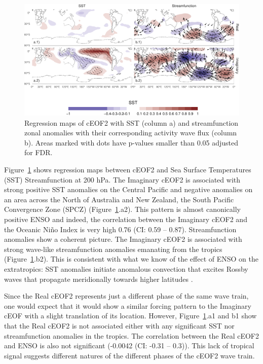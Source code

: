 \documentclass[smallextended]{svjour3}       %
\begin{document}
\begin{figure}
\includegraphics{../figures/sst-psi-2-1} \caption{Regression maps of cEOF2 with SST (column a) and streamfunction zonal anomalies with their corresponding activity wave flux (column b). Areas marked with dots have p-values smaller than 0.05 adjusted for FDR.}\label{fig:sst-psi-2}
\end{figure}

Figure~\ref{fig:sst-psi-2} shows regression maps between cEOF2 and Sea Surface Temperatures (SST) Streamfunction at 200 hPa. The Imaginary cEOF2 is associated with strong positive SST anomalies on the Central Pacific and negative anomalies on an area across the North of Australia and New Zealand, the South Pacific Convergence Zone (SPCZ) (Figure~\ref{fig:sst-psi-2}.a2). This pattern is almost canonically positive ENSO and indeed, the correlation between the Imaginary cEOF2 and the Oceanic Niño Index \citep{bamston1997} is very high 0.76 (CI: 0.59 -- 0.87). Streamfunction anomalies show a coherent picture. The Imaginary cEOF2 is associated with strong wave-like streamfunction anomalies emanating from the tropics (Figure~\ref{fig:sst-psi-2}.b2). This is consistent with what we know of the effect of ENSO on the extratropics: SST anomalies initiate anomalous convection that excites Rossby waves that propagate meridionally towards higher latitudes \citep{mo2000}.

Since the Real cEOF2 represents just a different phase of the same wave train, one would expect that it would show a similar forcing pattern to the Imaginary cEOF with a slight translation of its location. However, Figure~\ref{fig:sst-psi-2}.a1 and b1 show that the Real cEOF2 is not associated either with any significant SST nor streamfunction anomalies in the tropics. The correlation between the Real cEOF2 and ENSO is also not significant (-0.0042 (CI: -0.31 -- 0.3)). This lack of tropical signal suggests different natures of the different phases of the cEOF2 wave train.
\end{document}

